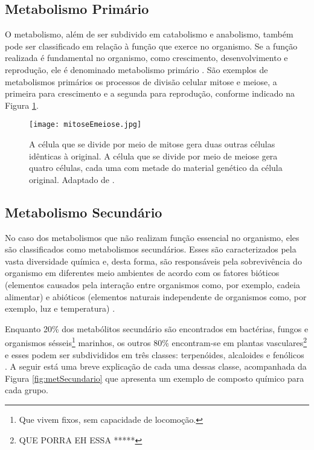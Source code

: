 \subsection{Metabolismo Primário}


\indent O metabolismo, além de ser subdivido em catabolismo e anabolismo, também pode ser classificado em relação à função que exerce no organismo. Se a função realizada é fundamental no organismo, como crescimento, desenvolvimento e reprodução, ele é denominado metabolismo primário \cite{Cap3schomburg}. São exemplos de metabolismos primários os processos de divisão celular mitose e meiose, a primeira para crescimento e a segunda para reprodução, conforme indicado na Figura \ref{fig:mitoseEmeiose}.

\begin{figure}[h]
    \centering
    \texttt{[image: mitoseEmeiose.jpg]}
    \caption{A célula que se divide por meio de mitose gera duas outras células idênticas à original. A célula que se divide por meio de meiose gera quatro células, cada uma com metade do material genético da célula original. Adaptado de \cite{mitoseMeiose}. }
    \label{fig:mitoseEmeiose}
\end{figure} 

\subsection{Metabolismo Secundário}

\indent No caso dos metabolismos que não realizam função essencial no organismo, eles são classificados como metabolismos secundários. Esses são caracterizados pela vasta diversidade química e, desta forma, são responsáveis pela sobrevivência do organismo em diferentes meio ambientes de acordo com os fatores bióticos (elementos causados pela interação entre organismos como, por exemplo, cadeia alimentar) e abióticos (elementos naturais independente de organismos como, por exemplo, luz e temperatura) \cite{Cap3schomburg}.

\indent Enquanto 20\% dos metabólitos secundário são encontrados em bactérias, fungos e organismos sésseis\footnote{Que vivem fixos, sem capacidade de locomoção.} marinhos, os outros 80\% encontram-se em plantas vasculares\footnote{QUE PORRA EH ESSA *****} \cite{Cap3schomburg} e esses podem ser subdivididos em três classes: terpenóides, alcaloides e fenólicos \cite{kabera14}. A seguir está uma breve explicação de cada uma dessas classe, acompanhada da Figura \ref{fig:metSecundario} que apresenta um exemplo de composto químico para cada grupo.

